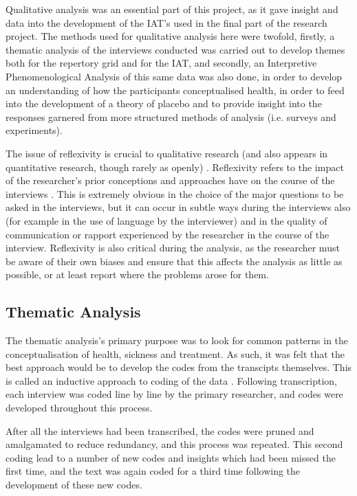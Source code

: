 Qualitative analysis was an essential part of this project, as it gave insight and data into the development of the IAT's used in the final part of the research project. The methods used for qualitative analysis here were twofold, firstly, a thematic analysis \cite{braun2006using} of the interviews conducted was carried out to develop themes both for the repertory grid and for the IAT, and secondly, an Interpretive Phenomenological Analysis \cite{smith2003interpretative}  of this same data was also done, in order to develop an understanding of how the participants conceptualised health, in order to feed into the development of a theory of placebo and to provide insight into the responses garnered from more structured methods of analysis (i.e. surveys and experiments).

The issue of reflexivity is crucial to qualitative research (and also appears in quantitative research, though rarely as openly) \cite{rosenthal1967covert, rosenthal1969interpersonal}.
Reflexivity refers to the impact of the researcher's prior conceptions and approaches have on the course of the interviews \cite{finlay2002outing}. This is extremely obvious in the choice of the major questions to be asked in the interviews, but it can occur in subtle ways during the interviews also (for example in the use of language by the interviewer) and in the quality of communication or rapport experienced by the researcher in the course of the interview. Reflexivity is also critical during the analysis, as the researcher must be aware of their own biases and ensure that this affects the analysis as little as possible, or at least report where the problems arose for them.

\subsection{Thematic Analysis}

The thematic analysis's primary purpose was to look for common patterns in the conceptualisation of health, sickness and treatment. As such, it was felt that the best approach would be to develop the codes from the transcipts themselves. This is called an inductive approach to coding of the data \cite{haberman1979analysis}.   Following transcription, each interview was coded line by line by the primary researcher, and codes were developed throughout this process.

After all the interviews had been transcribed, the codes were pruned and amalgamated to reduce redundancy, and this process was repeated. This second coding lead to a number of new codes and insights which had been missed the first time, and the text was again coded for a third time following the development of these new codes.

